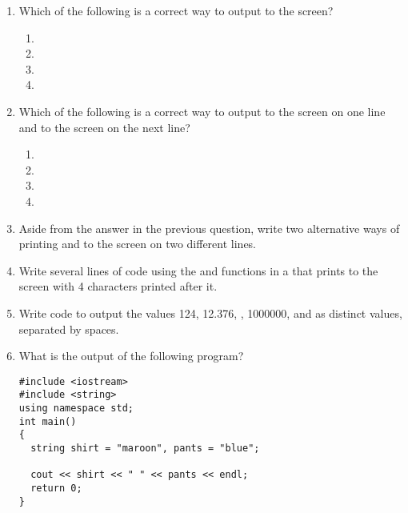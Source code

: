 \begin{enumerate}
	\item Which of the following is a correct way to output  to the screen?
	  \begin{enumerate}
	  \item {}
	  \item {}
	  \item {}
	  \item {}
	  \end{enumerate}
  \item Which of the following is a correct way to output  to the screen on one line and  to the screen on the next line?
		\begin{enumerate}
		\item {}
		\item {}
		\item {}
		\item {}
		\end{enumerate}
  \item Aside from the answer in the previous question, write two alternative ways of printing  and  to the screen on two different lines.
	\item Write several lines of code using the  and  functions in a  that prints  to the screen with 4  characters printed after it.
	\item Write code to output the values 124, 12.376, , 1000000, and  as distinct values, separated by spaces.
	\item What is the output of the following program?

\noindent\begin{minipage}{\linewidth}\begin{lstlisting}
#include <iostream>
#include <string>
using namespace std;
int main()
{
  string shirt = "maroon", pants = "blue";

  cout << shirt << " " << pants << endl;
  return 0;
}
\end{lstlisting}\end{minipage}

\end{enumerate}

